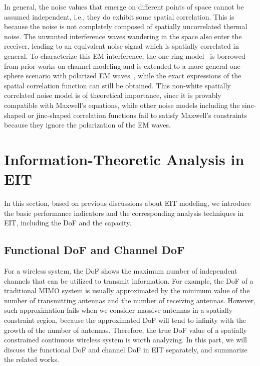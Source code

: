 \documentclass[journal,twocolumn]{IEEEtran}
\begin{document}
In general, the noise values that emerge on different points of space cannot be assumed independent, i.e., they do exhibit some spatial correlation. 
This is because the noise is not completely composed of spatially uncorrelated thermal noise. 
The unwanted interference waves wandering in the space also enter the receiver, leading to an equivalent noise signal which is spatially correlated in general. 
To characterize this EM interference, the one-ring model~\cite{patzold2004space} is borrowed from prior works on channel modeling and is extended to a more general one-sphere scenario with polarized EM waves~\cite{wan2022mutual}, while the exact expressions of the spatial correlation function can still be obtained. 
This non-white spatially correlated noise model is of theoretical importance, since it is provably compatible with Maxwell's equations, while other noise models including the sinc-shaped or jinc-shaped correlation functions fail to satisfy Maxwell's constraints because they ignore the polarization of the EM waves. 

\section{Information-Theoretic Analysis in EIT}
In this section, based on previous discussions about EIT modeling, we introduce the basic performance indicators and the corresponding analysis techniques in EIT, including the DoF and the capacity. 

\subsection{Functional DoF and Channel DoF}
\label{Sec_3_Subsec_2}
For a wireless system, the DoF shows the maximum number of independent channels that can be utilized to transmit information. For example, the DoF of a traditional MIMO system is usually approximated by the minimum value of the number of transmitting antennas and the number of receiving antennas. However, such approximation fails when we consider massive antennas in a spatially-constraint region, because the approximated DoF will tend to infinity with the growth of the number of antennas. Therefore, the true DoF value of a spatially constrained continuous wireless system is worth analyzing. In this part, we will discuss the functional DoF and channel DoF in EIT separately, and summarize the related works.
\end{document}
